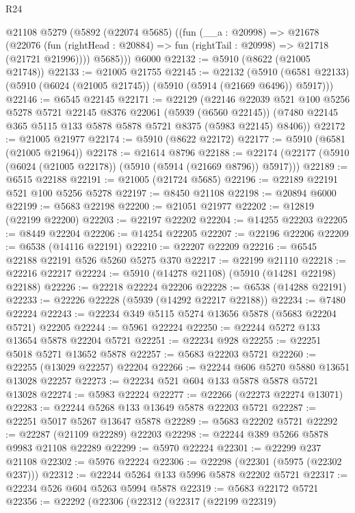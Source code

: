 \begin{lexlean}{R24}
\begin{coremodule}
      @21108
      @5279
      (@5892
        (@22074 @5685)
        ((fun (__a : @20998) =>
        @21678
          (@22076 (fun (rightHead : @20884) => fun (rightTail : @20998) => @21718 (@21721 @21996))))
          @5685)))
    @6000
@22132 := @5910 (@8622 (@21005 @21748))
@22133 := @21005 @21755
@22145 := @22132
    (@5910 (@6581 @22133) (@5910 (@6024 (@21005 @21745)) (@5910 (@5914 (@21669 @6496)) @5917)))
@22146 := @6545 @22145
@22171 := @22129
    (@22146
      @22039
      @521
      @100
      @5256
      @5278
      @5721
      @22145
      @8376
      @22061
      (@5939 (@6560 @22145))
      (@7480 @22145 @365 @5115 @133 @5878 @5878 @5721 @8375 (@5983 @22145) @8406))
@22172 := @21005 @21977
@22174 := @5910 (@8622 @22172)
@22177 := @5910 (@6581 (@21005 @21964))
@22178 := @21614 @8796
@22188 := @22174 (@22177 (@5910 (@6024 (@21005 @22178)) (@5910 (@5914 (@21669 @8796)) @5917)))
@22189 := @6515 @22188
@22191 := @21005 (@21724 @5685)
@22196 := @22189 @22191 @521 @100 @5256 @5278
@22197 := @8450 @21108
@22198 := @20894 @6000
@22199 := @5683 @22198
@22200 := @21051 @21977
@22202 := @12819 (@22199 @22200)
@22203 := @22197 @22202
@22204 := @14255 @22203
@22205 := @8449 @22204
@22206 := @14254 @22205
@22207 := @22196 @22206
@22209 := @6538 (@14116 @22191)
@22210 := @22207 @22209
@22216 := @6545 @22188 @22191 @526 @5260 @5275 @370
@22217 := @22199 @21110
@22218 := @22216 @22217
@22224 := @5910 (@14278 @21108) (@5910 (@14281 @22198) @22188)
@22226 := @22218 @22224 @22206
@22228 := @6538 (@14288 @22191)
@22233 := @22226 @22228 (@5939 (@14292 @22217 @22188))
@22234 := @7480 @22224
@22243 := @22234 @349 @5115 @5274 @13656 @5878 (@5683 @22204 @5721) @22205
@22244 := @5961 @22224
@22250 := @22244 @5272 @133 @13654 @5878 @22204 @5721
@22251 := @22234 @928
@22255 := @22251 @5018 @5271 @13652 @5878
@22257 := @5683 @22203 @5721
@22260 := @22255 (@13029 @22257) @22204
@22266 := @22244 @606 @5270 @5880 @13651 @13028 @22257
@22273 := @22234 @521 @604 @133 @5878 @5878 @5721 @13028
@22274 := @5983 @22224
@22277 := @22266 (@22273 @22274 @13071)
@22283 := @22244 @5268 @133 @13649 @5878 @22203 @5721
@22287 := @22251 @5017 @5267 @13647 @5878
@22289 := @5683 @22202 @5721
@22292 := @22287 (@21109 @22289) @22203
@22298 := @22244 @389 @5266 @5878 @9983 @21108 @22289
@22299 := @5970 @22224
@22301 := @22299 @237 @21108
@22302 := @5976 @22224
@22306 := @22298 (@22301 (@5975 (@22302 @237)))
@22312 := @22244 @5264 @133 @5996 @5878 @22202 @5721
@22317 := @22234 @526 @604 @5263 @5994 @5878
@22319 := @5683 @22172 @5721
@22356 := @22292
    (@22306
      (@22312
        (@22317
          (@22199 @22319)

\end{coremodule}
\end{lexlean}
